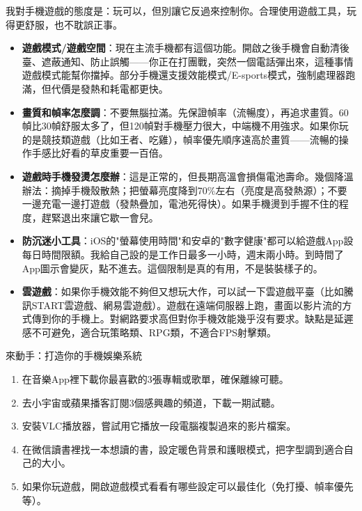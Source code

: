 
我對手機遊戲的態度是：玩可以，但別讓它反過來控制你。合理使用遊戲工具，玩得更舒服，也不耽誤正事。

\begin{itemize}
  \item \textbf{遊戲模式/遊戲空間}：現在主流手機都有這個功能。開啟之後手機會自動清後臺、遮蔽通知、防止誤觸——你正在打團戰，突然一個電話彈出來，這種事情遊戲模式能幫你擋掉。部分手機還支援效能模式/E-sports模式，強制處理器跑滿，但代價是發熱和耗電都更快。
  \item \textbf{畫質和幀率怎麼調}：不要無腦拉滿。先保證幀率（流暢度），再追求畫質。60幀比30幀舒服太多了，但120幀對手機壓力很大，中端機不用強求。如果你玩的是競技類遊戲（比如王者、吃雞），幀率優先順序遠高於畫質——流暢的操作手感比好看的草皮重要一百倍。
  \item \textbf{遊戲時手機發燙怎麼辦}：這是正常的，但長期高溫會損傷電池壽命。幾個降溫辦法：摘掉手機殼散熱；把螢幕亮度降到70\%左右（亮度是高發熱源）；不要一邊充電一邊打遊戲（發熱疊加，電池死得快）。如果手機燙到手握不住的程度，趕緊退出來讓它歇一會兒。
  \item \textbf{防沉迷小工具}：iOS的"螢幕使用時間"和安卓的"數字健康"都可以給遊戲App設每日時間限額。我給自己設的是工作日最多一小時，週末兩小時。到時間了App圖示會變灰，點不進去。這個限制是真的有用，不是裝裝樣子的。
  \item \textbf{雲遊戲}：如果你手機效能不夠但又想玩大作，可以試一下雲遊戲平臺（比如騰訊START雲遊戲、網易雲遊戲）。遊戲在遠端伺服器上跑，畫面以影片流的方式傳到你的手機上。對網路要求高但對你手機效能幾乎沒有要求。缺點是延遲感不可避免，適合玩策略類、RPG類，不適合FPS射擊類。
\end{itemize}

\begin{tcbpractice}{來動手：打造你的手機娛樂系統}
\begin{enumerate}
  \item 在音樂App裡下載你最喜歡的3張專輯或歌單，確保離線可聽。
  \item 去小宇宙或蘋果播客訂閱3個感興趣的頻道，下載一期試聽。
  \item 安裝VLC播放器，嘗試用它播放一段電腦複製過來的影片檔案。
  \item 在微信讀書裡找一本想讀的書，設定暖色背景和護眼模式，把字型調到適合自己的大小。
  \item 如果你玩遊戲，開啟遊戲模式看看有哪些設定可以最佳化（免打擾、幀率優先等）。
\end{enumerate}

\end{tcbpractice}
